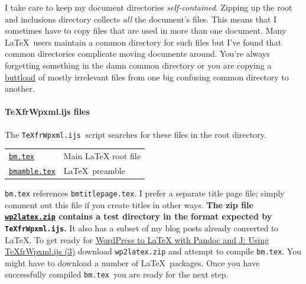 I take care to keep my document directories \emph{self-contained}.
Zipping up the root and inclusions directory collects \emph{all} the
document's files. This means that I sometimes have to copy files that
are used in more than one document. Many \LaTeX\ users maintain a common
directory for such files but I've found that common directories
complicate moving documents around. You're always forgetting something
in the damn common directory or you are copying a
\href{http://www.urbandictionary.com/define.php?term=buttload}{buttload}
of mostly irrelevant files from one big confusing common directory to
another.

\paragraph{TeXfrWpxml.ijs files}

The \texttt{TeXfrWpxml.ijs~}script searches for these files in the root
directory.

\begin{center}
\begin{tabular}{lp{}} 
   \href{https://github.com/bakerjd99/Analyze-the-Data-not-the-Drivel/blob/master/wp2latex/bm.tex}{\texttt{bm.tex}}            & Main LaTeX root file  \\ 
   \href{https://github.com/bakerjd99/Analyze-the-Data-not-the-Drivel/blob/master/wp2latex/bmamble.tex}{\texttt{bmamble.tex}}  & \LaTeX\ preamble      \\ 
\end{tabular}
\end{center}

\noindent\texttt{bm.tex} references \texttt{bmtitlepage.tex}. I prefer a separate
title page file; simply comment out this file if you create titles in
other ways. \textbf{The zip file
\href{https://github.com/bakerjd99/jacks/blob/master/texfrwpxml/wp2latex.zip}{\texttt{wp2latex.zip}}
contains a test directory in the format expected by
\texttt{TeXfrWpxml.ijs}.} It also has a subset of my blog posts already
converted to \LaTeX. To get ready for
\href{https://bakerjd99.wordpress.com/2012/02/25/wordpress-to-latex-with-pandoc-and-j-using-texfrwpxml-ijs-part-3/}{WordPress
to LaTeX with Pandoc and J: Using TeXfrWpxml.ijs (3)} download
\texttt{wp2latex.zip} and attempt to compile \texttt{bm.tex}. You might
have to download a number of \LaTeX\ packages. Once you have successfully
compiled \texttt{bm.tex~}you are ready for the next step.



